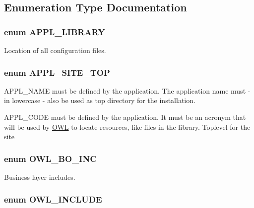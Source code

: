 \subsection{Enumeration Type Documentation}
\subsubsection[{APPL\_\-LIBRARY}]{\setlength{\rightskip}{0pt plus 5cm}enum {\bf APPL\_\-LIBRARY}}\label{OWLloader_8php_a1b19bb6ffba1d1e7871092e086cc4e94}


Location of all configuration files. 

\subsubsection[{APPL\_\-SITE\_\-TOP}]{\setlength{\rightskip}{0pt plus 5cm}enum {\bf APPL\_\-SITE\_\-TOP}}\label{OWLloader_8php_a17a0c6fb6eda7d05081d16bc519c97b5}


APPL\_\-NAME must be defined by the application. The application name must -\/ in lowercase -\/ also be used as top directory for the installation. 

APPL\_\-CODE must be defined by the application. It must be an acronym that will be used by \hyperlink{classOWL}{OWL} to locate resources, like files in the library. Toplevel for the site 
\subsubsection[{OWL\_\-BO\_\-INC}]{\setlength{\rightskip}{0pt plus 5cm}enum {\bf OWL\_\-BO\_\-INC}}\label{OWLloader_8php_aca50646bc73c3addf0e0f25081eae0ae}


Business layer includes. 

\subsubsection[{OWL\_\-INCLUDE}]{\setlength{\rightskip}{0pt plus 5cm}enum {\bf OWL\_\-INCLUDE}}\label{OWLloader_8php_a4d33a8f2fcc9c83cbeea921c4cb23a7f}


